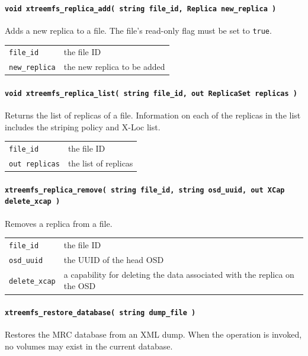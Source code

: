 \paragraph{\texttt{void xtreemfs\_replica\_add( string file\_id, Replica new\_replica )}}
Adds a new replica to a file. The file's read-only flag must be set to \texttt{true}.

\begin{tabularx}{\textwidth}{lX}
 \texttt{file\_id} & the file ID\\
 \texttt{new\_replica} & the new replica to be added\\
\end{tabularx}

\paragraph{\texttt{void xtreemfs\_replica\_list( string file\_id, out ReplicaSet replicas~)}}
Returns the list of replicas of a file. Information on each of the replicas in the list includes the striping policy and X-Loc list.

\begin{tabularx}{\textwidth}{lX}
 \texttt{file\_id} & the file ID\\
 \texttt{out replicas} & the list of replicas\\
\end{tabularx}

\paragraph{\texttt{xtreemfs\_replica\_remove( string file\_id, string osd\_uuid, out XCap delete\_xcap )}}
Removes a replica from a file.

\begin{tabularx}{\textwidth}{lX}
 \texttt{file\_id} & the file ID\\
 \texttt{osd\_uuid} & the UUID of the head OSD\index{OSD}\\
 \texttt{delete\_xcap} & a capability for deleting the data associated with the replica on the OSD\index{OSD}\\
\end{tabularx}

\paragraph{\texttt{xtreemfs\_restore\_database( string dump\_file )}}
Restores the MRC database from an XML dump. When the operation is invoked, no volumes may exist in the current database.

